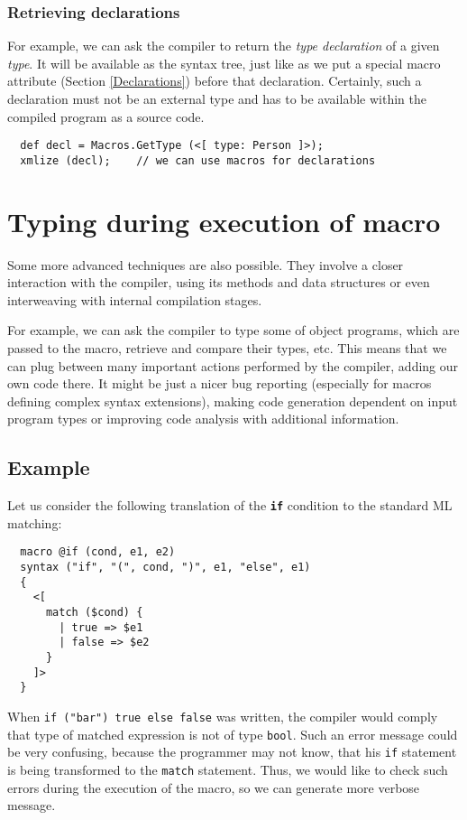 \documentclass{llncs}
\newcommand{\kw}[1]{{\tt \bf #1}}
\begin{document}
\subsubsection{Retrieving declarations}
For example, we can ask the compiler to return the \emph{type declaration} 
of a given \emph{type}. It will be available as the syntax tree, just like 
as we put a special macro attribute (Section \ref{Declarations}) before that declaration.
Certainly, such a declaration must not be an external type 
and has to be available within the compiled program as a source code.

\begin{verbatim}
  def decl = Macros.GetType (<[ type: Person ]>);
  xmlize (decl);    // we can use macros for declarations
\end{verbatim}

\section{Typing during execution of macro}
Some more advanced techniques are also possible. They involve a closer
interaction with the compiler, using its methods and data structures
or even interweaving with internal compilation stages.

For example, we can ask the compiler to type some of object programs,
which are passed to the macro, retrieve and compare their types, etc.
This means that we can plug between many important actions performed by 
the compiler, adding our own code there. It might be just a nicer 
bug reporting (especially for macros defining complex syntax extensions), 
making code generation dependent on input program types or improving
code analysis with additional information.

\subsection{Example}
Let us consider the following translation of the \kw{if} condition to the standard
ML matching:

\begin{verbatim}
  macro @if (cond, e1, e2)
  syntax ("if", "(", cond, ")", e1, "else", e1) 
  {
    <[ 
      match ($cond) {
        | true => $e1
        | false => $e2
      }       
    ]>
  }
\end{verbatim} %

When \verb,if ("bar") true else false, was written, the compiler would comply
that type of matched expression is not of type \verb,bool,. Such an error 
message could be very confusing, because the programmer may not know, that his 
\verb,if, statement is being transformed to the \verb,match, statement. Thus, 
we would like to check such errors during the execution of the macro, so we can
generate more verbose message.
\end{document}
